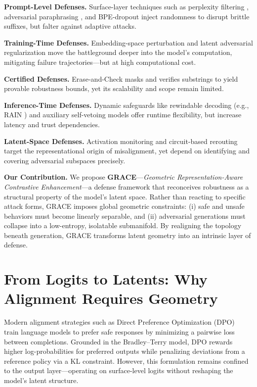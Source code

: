 \textbf{Prompt-Level Defenses.} Surface-layer techniques such as perplexity filtering \cite{jain2023baseline}, adversarial paraphrasing \cite{phute2023jailbreak}, and BPE-dropout inject randomness to disrupt brittle suffixes, but falter against adaptive attacks.

\textbf{Training-Time Defenses.} Embedding-space perturbation \cite{xhonneux2024robustness} and latent adversarial regularization \cite{sheshadri2024latent} move the battleground deeper into the model’s computation, mitigating failure trajectories—but at high computational cost.

\textbf{Certified Defenses.} Erase-and-Check \cite{kumar2023certifying} masks and verifies substrings to yield provable robustness bounds, yet its scalability and scope remain limited.

\textbf{Inference-Time Defenses.} Dynamic safeguards like rewindable decoding (e.g., RAIN \cite{li2024rain}) and auxiliary self-vetoing models \cite{phute2023jailbreak} offer runtime flexibility, but increase latency and trust dependencies.

\textbf{Latent-Space Defenses.} Activation monitoring \cite{templeton2024activations} and circuit-based rerouting \cite{zou2024cygnet} target the representational origin of misalignment, yet depend on identifying and covering adversarial subspaces precisely.


\textbf{Our Contribution.} We propose \textbf{GRACE}—\emph{Geometric Representation-Aware Contrastive Enhancement}—a defense framework that reconceives robustness as a structural property of the model’s latent space. Rather than reacting to specific attack forms, GRACE imposes global geometric constraints: (i) safe and unsafe behaviors must become linearly separable, and (ii) adversarial generations must collapse into a low-entropy, isolatable submanifold. By realigning the topology beneath generation, GRACE transforms latent geometry into an intrinsic layer of defense.




\section{From Logits to Latents: Why Alignment Requires Geometry}
\label{sec:appendix_logit_to_latent}

Modern alignment strategies such as Direct Preference Optimization (DPO)~\cite{rafailov2023direct} train language models to prefer safe responses by minimizing a pairwise loss between completions. Grounded in the Bradley–Terry model, DPO rewards higher log-probabilities for preferred outputs while penalizing deviations from a reference policy via a KL constraint. However, this formulation remains confined to the output layer—operating on surface-level logits without reshaping the model’s latent structure.

